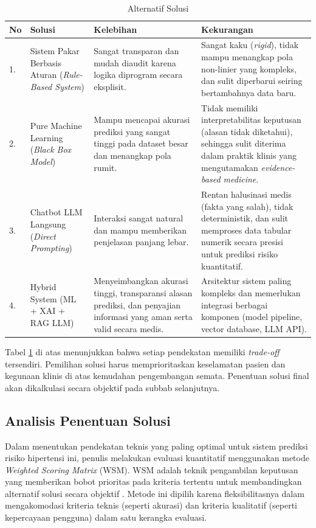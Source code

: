 \begin{table}[ht]
    \caption{Alternatif Solusi}
    \label{tab:alternatif-solusi}
    \centering
    \small
    \begin{tabular}{|p{0.5cm}|p{3.5cm}|p{4.5cm}|p{4.5cm}|}
        \hline
        \textbf{No} & \textbf{Solusi} & \textbf{Kelebihan} & \textbf{Kekurangan} \\
        \hline
        1. & Sistem Pakar Berbasis Aturan (\textit{Rule-Based System}) & Sangat transparan dan mudah diaudit karena logika diprogram secara eksplisit. & Sangat kaku (\textit{rigid}), tidak mampu menangkap pola non-linier yang kompleks, dan sulit diperbarui seiring bertambahnya data baru. \\
        \hline
        2. & Pure Machine Learning (\textit{Black Box Model}) & Mampu mencapai akurasi prediksi yang sangat tinggi pada dataset besar dan menangkap pola rumit. & Tidak memiliki interpretabilitas keputusan (alasan tidak diketahui), sehingga sulit diterima dalam praktik klinis yang mengutamakan \textit{evidence-based medicine}. \\
        \hline
        3. & Chatbot LLM Langsung (\textit{Direct Prompting}) & Interaksi sangat natural dan mampu memberikan penjelasan panjang lebar. & Rentan halusinasi medis (fakta yang salah), tidak deterministik, dan sulit memproses data tabular numerik secara presisi untuk prediksi risiko kuantitatif. \\
        \hline
        4. & Hybrid System (ML + XAI + RAG LLM) & Menyeimbangkan akurasi tinggi, transparansi alasan prediksi, dan penyajian informasi yang aman serta valid secara medis. & Arsitektur sistem paling kompleks dan memerlukan integrasi berbagai komponen (model pipeline, vector database, LLM API). \\
        \hline
    \end{tabular}
\end{table}

Tabel \ref{tab:alternatif-solusi} di atas menunjukkan bahwa setiap pendekatan memiliki \textit{trade-off} tersendiri. Pemilihan solusi harus memprioritaskan keselamatan pasien dan kegunaan klinis di atas kemudahan pengembangan semata. Penentuan solusi final akan dikalkulasi secara objektif pada subbab selanjutnya.

\subsection{Analisis Penentuan Solusi}
Dalam menentukan pendekatan teknis yang paling optimal untuk sistem prediksi risiko hipertensi ini, penulis melakukan evaluasi kuantitatif menggunakan metode \textit{Weighted Scoring Matrix} (WSM). WSM adalah teknik pengambilan keputusan yang memberikan bobot prioritas pada kriteria tertentu untuk membandingkan alternatif solusi secara objektif \parencite{Ouchra2021Comparative}. Metode ini dipilih karena fleksibilitasnya dalam mengakomodasi kriteria teknis (seperti akurasi) dan kriteria kualitatif (seperti kepercayaan pengguna) dalam satu kerangka evaluasi.

